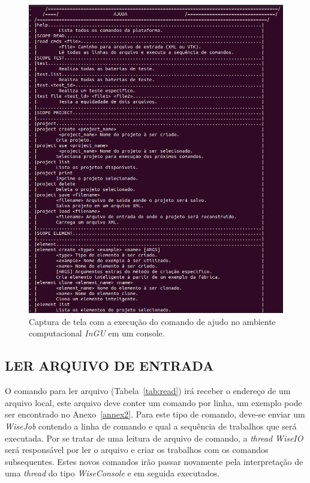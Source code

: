 \begin{figure}[!htbp]
	\centering
	\includegraphics[scale=0.45]{Figures/InGU_help.png}
	\caption{Captura de tela com a execução do comando de ajudo no ambiente computacional \textit{InGU} em um console.}
	\label{fig10:ajuda}
\end{figure}


\subsection{LER ARQUIVO DE ENTRADA}\label{sec:read_cmds}


O comando para ler arquivo (Tabela~\ref{tab:read}) irá receber o endereço de um arquivo local, este arquivo deve conter um comando por linha, um exemplo pode ser encontrado no Anexo~\ref{annex2}. Para este tipo de comando, deve-se enviar um \textit{WiseJob} contendo a linha de comando e qual a sequência de trabalhos que será executada. Por se tratar de uma leitura de arquivo de comando, a \textit{thread} \textit{WiseIO} será responsável por ler o arquivo e criar os trabalhos com os comandos subsequentes. Estes novos comandos irão passar novamente pela interpretação de uma \textit{thread} do tipo \textit{WiseConsole} e em seguida executados.

